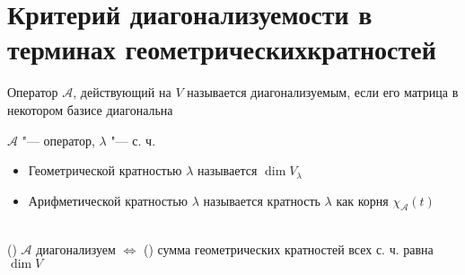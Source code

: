 \section{Критерий диагонализуемости в терминах геометрических\n кратностей}

\begin{definition}
	Оператор $ \mathcal{A} $, действующий на $ V $ называется диагонализуемым, если его матрица в некотором базисе диагональна
\end{definition}

\begin{definition}
	$ \mathcal{A} $ "--- оператор, $ \lambda $ "--- с. ч.
	\begin{itemize}
		\item Геометрической кратностью $ \lambda $ называется $ \dim V_\lambda $
		\item Арифметической кратностью $ \lambda $ называется кратность $ \lambda $ как корня $ \chi_{\mathcal{A}}(t) $
	\end{itemize}
\end{definition}

\begin{theorem}
	\hfill \\
	() $ \mathcal{A} $ диагонализуем $ \iff $ () сумма геометрических кратностей всех с. ч. равна $ \dim V $
\end{theorem}

